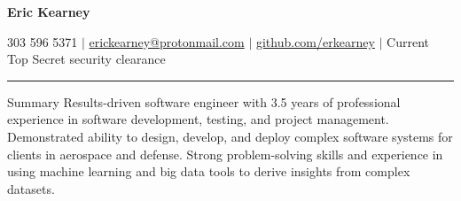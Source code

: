\documentclass[8pt]{resumeclass}
\begin{document}
\centerline{\textbf{\LARGE{Eric Kearney}}}
\vspace{2pt}
\centerline{303 596 5371 $|$
\href{mailto:erickearney@protonmail.com}{erickearney@protonmail.com} $|$
\href{https://github.com/erkearney}{github.com/erkearney} $|$ Current Top Secret
security clearance}
\vspace{2pt}
\rule{\textwidth}{0.4pt}
\vspace{0.5pt}

\resumesect
    {Summary}
    {Results-driven software engineer with 3.5 years of professional experience
    in software development, testing, and project management. Demonstrated
    ability to design, develop, and deploy complex software systems for clients
    in aerospace and defense. Strong problem-solving skills and experience in
    using machine learning and big data tools to derive insights from complex
    datasets.}
\vspace{8pt}
\end{document}
